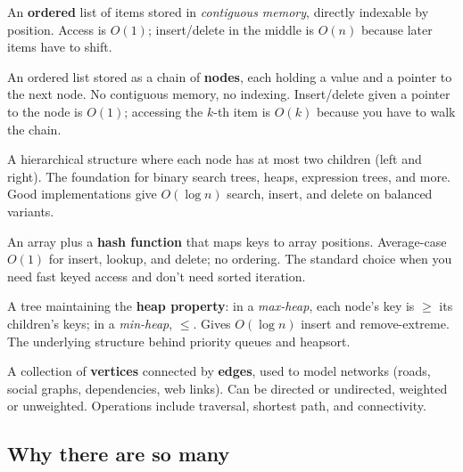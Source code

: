 \documentclass[11pt]{article}
\begin{document}
\begin{defnbox}
An \textbf{ordered} list of items stored in \emph{contiguous memory},
directly indexable by position. Access is $O(1)$; insert/delete in
the middle is $O(n)$ because later items have to shift.
\end{defnbox}

\begin{defnbox}
An ordered list stored as a chain of \textbf{nodes}, each holding a
value and a pointer to the next node. No contiguous memory, no
indexing. Insert/delete given a pointer to the node is $O(1)$;
accessing the $k$-th item is $O(k)$ because you have to walk the
chain.
\end{defnbox}

\begin{defnbox}
A hierarchical structure where each node has at most two children
(left and right). The foundation for binary search trees, heaps,
expression trees, and more. Good implementations give $O(\log n)$
search, insert, and delete on balanced variants.
\end{defnbox}

\begin{defnbox}
An array plus a \textbf{hash function} that maps keys to array
positions. Average-case $O(1)$ for insert, lookup, and delete; no
ordering. The standard choice when you need fast keyed access and
don't need sorted iteration.
\end{defnbox}

\begin{defnbox}[Heap]
A tree maintaining the \textbf{heap property}: in a \emph{max-heap},
each node's key is $\ge$ its children's keys; in a \emph{min-heap},
$\le$. Gives $O(\log n)$ insert and remove-extreme. The underlying
structure behind priority queues and heapsort.
\end{defnbox}

\begin{defnbox}[Graph]
A collection of \textbf{vertices} connected by \textbf{edges}, used
to model networks (roads, social graphs, dependencies, web links).
Can be directed or undirected, weighted or unweighted. Operations
include traversal, shortest path, and connectivity.
\end{defnbox}

\subsection{Why there are so many}
\end{document}
